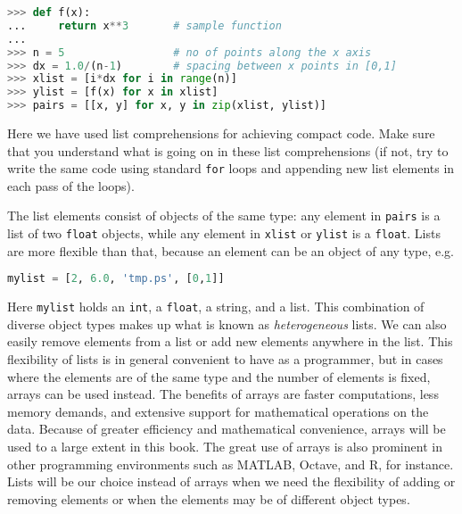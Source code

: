 \documentclass[graybox,sectrefs,envcountresetchap,open=right,final]{svmonodo}
\begin{document}
\begin{lstlisting}[language=python,style=simple,xleftmargin=2mm]
>>> def f(x):
...     return x**3       # sample function
...
>>> n = 5                 # no of points along the x axis
>>> dx = 1.0/(n-1)        # spacing between x points in [0,1]
>>> xlist = [i*dx for i in range(n)]
>>> ylist = [f(x) for x in xlist]
>>> pairs = [[x, y] for x, y in zip(xlist, ylist)]

\end{lstlisting}

Here we have used list comprehensions for achieving compact code. Make
sure that you understand what is going on in these list comprehensions
(if not, try to write the same code using standard \texttt{for} loops and
appending new list elements in each pass of the loops).


The list elements consist of objects of the same type: any element in
\texttt{pairs} is a list of two \texttt{float} objects, while any element in \texttt{xlist}
or \texttt{ylist} is a \texttt{float}. Lists are more flexible than that, because an
element can be an object of any type, e.g. 



\begin{lstlisting}[language=python,style=simple,xleftmargin=2mm]
mylist = [2, 6.0, 'tmp.ps', [0,1]]

\end{lstlisting}

Here \texttt{mylist} holds an \texttt{int}, a \texttt{float}, a string, and a list. This
combination of diverse object types makes up what is known as
\emph{heterogeneous} lists.  We can also easily remove elements from a list
or add new elements anywhere in the list.  This flexibility of lists
is in general convenient to have as a programmer, but in cases where
the elements are of the same type and the number of elements is fixed,
arrays can be used instead. The benefits of arrays are faster
computations, less memory demands, and extensive support for
mathematical operations on the data.  Because of greater efficiency
and mathematical convenience, arrays will be used to a large extent in
this book.  The great use of arrays is also prominent in other
programming environments such as MATLAB, Octave, and R, for instance.
Lists will be our choice instead of arrays when we need the
flexibility of adding or removing elements or when the elements may be
of different object types.
\end{document}
